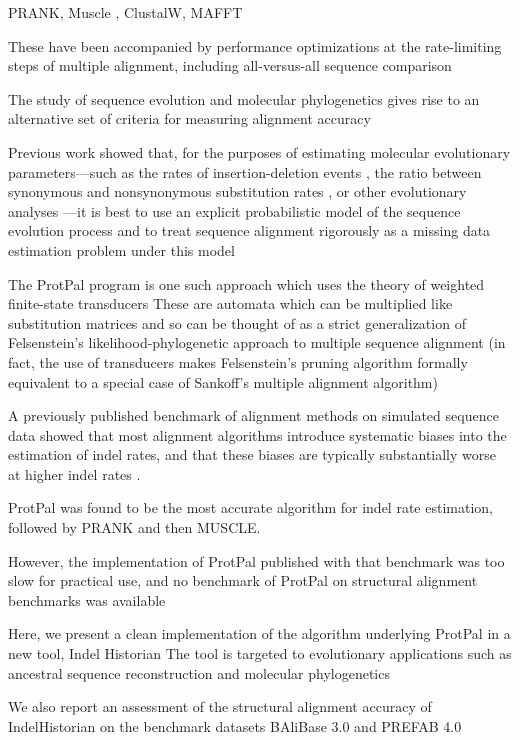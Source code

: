 \documentclass{bioinfo}
\begin{document}
PRANK\citep{LoytynojaGoldman2005}, Muscle \citep{Edgar2004b}, ClustalW\citep{LarkinEtAl2007}, MAFFT\citep{KatohEtAl2005}

These have been accompanied by performance optimizations at the rate-limiting steps
of multiple alignment, including all-versus-all sequence comparison \citep{BradleyEtAl2009,Edgar2004b}


The study of sequence evolution and molecular phylogenetics gives rise to
an alternative set of criteria for measuring alignment accuracy

Previous work showed that, for the purposes of estimating
molecular evolutionary parameters---such as the rates of insertion-deletion events \citep{Westesson2012-zg},
the ratio between synonymous and nonsynonymous substitution rates \citep{Redelings2014},
or other evolutionary analyses \citep{LoytynojaGoldman2008}---it is best to use an explicit probabilistic model of the sequence evolution process
and to treat sequence alignment rigorously as a missing data estimation problem
under this model


The ProtPal program is one such approach which uses the theory of
weighted finite-state transducers
These are automata which can be multiplied like substitution matrices
and so can be thought of as a strict generalization of Felsenstein's likelihood-phylogenetic
approach to multiple sequence alignment
(in fact, the use of transducers makes Felsenstein's pruning algorithm formally
equivalent to a special case of Sankoff's multiple alignment algorithm)

A previously published benchmark of alignment methods on simulated sequence data
showed that most alignment algorithms introduce systematic biases into the
estimation of indel rates, and that these biases are typically substantially worse
at higher indel rates \citep{Westesson2012-zg}.

ProtPal was found to be the most accurate algorithm for indel rate estimation,
followed by PRANK and then MUSCLE.

However, the implementation of ProtPal published with that benchmark was too slow
for practical use, and no benchmark of ProtPal on structural alignment benchmarks was available

Here, we present a clean implementation of the algorithm underlying ProtPal
in a new tool, Indel Historian
The tool is targeted to evolutionary applications such
as ancestral sequence reconstruction and molecular phylogenetics

We also report an assessment of the structural alignment accuracy of IndelHistorian on the benchmark datasets BAliBase 3.0 \citep{ThompsonEtAl2005}
and PREFAB 4.0 \citep{Edgar2010}
\end{document}
